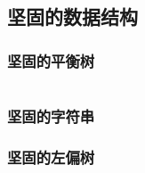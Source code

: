 \documentclass[landscape, oneside, a4paper, cs4size]{book}
\newcommand{\cppcode}[1]{
	\inputminted[mathescape,
	frame=lines,linenos]{cpp}{source/#1}
}
\begin{document}
\begin{multicols}{2}
\begin{spacing}{0.8}
\cppcode{data-structure/Treap.cpp}






\subsection{坚固的数据结构}






\subsubsection{坚固的平衡树}


\cppcode{data-structure/fhqTreap.cpp}


\subsubsection{坚固的字符串}









\subsubsection{坚固的左偏树}

\cppcode{data-structure/lefttree.cpp}






\end{spacing}
\end{multicols}
\end{document}
